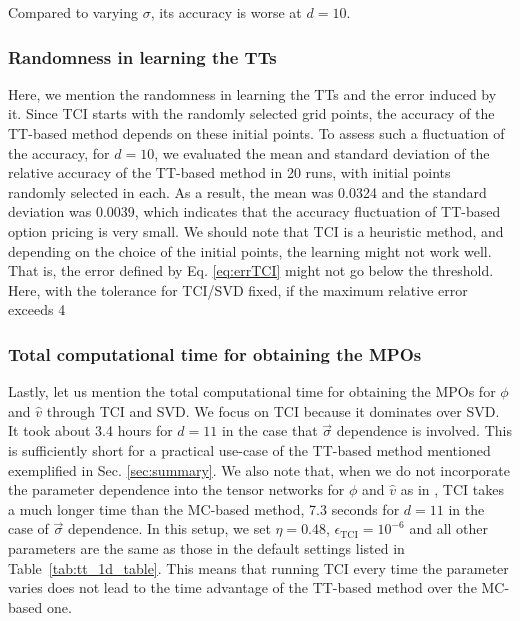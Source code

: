 Compared to varying \(\sigma\), its accuracy is worse at \(d=10\).

\subsubsection{Randomness in learning the TTs}
Here, we mention the randomness in learning the TTs and the error induced by it.
Since TCI starts with the randomly selected grid points, the accuracy of the TT-based method depends on these initial points.
To assess such a fluctuation of the accuracy, for \(d=10\), we evaluated the mean and standard deviation of the relative accuracy of the TT-based method in 20 runs, with initial points randomly selected in each. As a result, the mean was 0.0324 and the standard deviation was 0.0039, which indicates that the accuracy fluctuation of TT-based option pricing is very small.
We should note that TCI is a heuristic method, and depending on the choice of the initial points, the learning might not work well. That is, the error defined by Eq. \eqref{eq:errTCI} might not go below the threshold. 
Here, with the tolerance for TCI/SVD fixed, if the maximum relative error exceeds 4\
\subsubsection{Total computational time for obtaining the MPOs}

Lastly, let us mention the total computational time for obtaining the MPOs for $\phi$ and $\hat{v}$ through TCI and SVD.
We focus on TCI because it dominates over SVD.
It took about 3.4 hours for $d=11$ in the case that $\vec{\sigma}$ dependence is involved.
This is sufficiently short for a practical use-case of the TT-based method mentioned exemplified in Sec. \ref{sec:summary}.
We also note that, when we do not incorporate the parameter dependence into the tensor networks for $\phi$ and $\hat{v}$ as in \cite{kastoryano2022highly}, TCI takes a much longer time than the MC-based method, 7.3 seconds for $d=11$ in the case of $\vec{\sigma}$ dependence. 
In this setup, we set $\eta=0.48$, $\epsilon_{\mathrm{TCI}}=10^{-6}$ and all other parameters are the same as those in the default settings listed in Table~\ref{tab:tt_1d_table}.
This means that running TCI every time the parameter varies does not lead to the time advantage of the TT-based method over the MC-based one.


